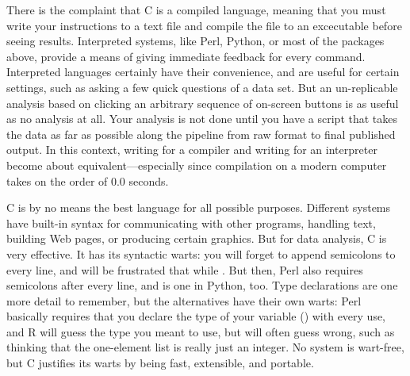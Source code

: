 There is the complaint that C is a compiled language, meaning that
you must write your instructions to a text file and compile the file
to an excecutable before seeing results. Interpreted systems,
like Perl, Python, or most of the packages above, provide a means of
giving immediate feedback for every command. Interpreted languages
certainly have their convenience, and are useful for certain settings,
such as asking a few quick questions of a data set. But an un-replicable
analysis based on clicking an arbitrary sequence of on-screen buttons
is as useful as no analysis at all.  Your analysis is not done until you
have a script that takes the data as far as possible along the pipeline
from raw format to final published output. In this context, writing  for
a compiler and writing  for an interpreter become about
equivalent---especially since compilation on a modern computer takes on
the order of 0.0 seconds.

C is by no means the best language for all possible purposes.
Different systems have built-in syntax for communicating with other programs, 
handling text, building Web pages, or producing certain graphics. But
for data analysis, C is very effective. It has its syntactic warts: you
will forget to append semicolons to every line, and will be frustrated
that  while . But then,
Perl also requires semicolons after every line, and  is one in
Python, too. Type declarations are one more detail to remember,
but the alternatives have their own warts: Perl basically requires that
you declare the type of your variable () with every use,
and R will guess the type you meant to use, but will often guess wrong,
such as thinking that the one-element list  is really just
an integer. No system is wart-free, but C justifies its warts by being fast,
extensible, and portable.




